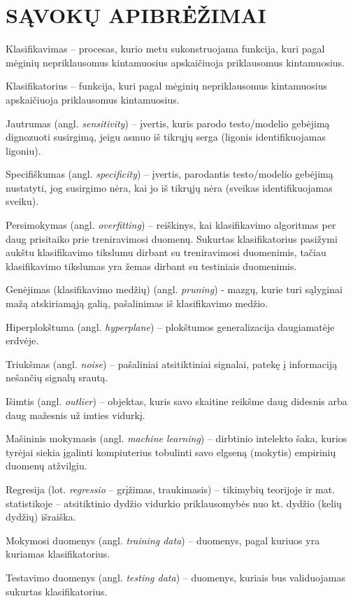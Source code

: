 \section*{SĄVOKŲ APIBRĖŽIMAI}
\label{savoku_apibrezimai}

Klasifikavimas -- procesas, kurio metu sukonstruojama funkcija, kuri pagal mėginių nepriklausomus kintamuosius apskaičiuoja priklausomus kintamuosius.

Klasifikatorius -- funkcija, kuri pagal mėginių nepriklausomus kintamuosius apskaičiuoja priklausomus kintamuosius.

Jautrumas (angl. \textit{sensitivity}) -- įvertis, kuris parodo testo/modelio gebėjimą dignozuoti susirgimą, jeigu asmuo iš tikrųjų serga (ligonis identifikuojamas ligoniu).

Specifiškumas (angl. \textit{specificity}) -- įvertis, parodantis testo/modelio gebėjimą nustatyti, jog susirgimo nėra, kai jo iš tikrųjų nėra (sveikas identifikuojamas sveiku).

Persimokymas (angl. \textit{overfitting}) -- reiškinys, kai klasifikavimo algoritmas per daug prisitaiko prie treniravimosi duomenų. Sukurtas klasifikatorius pasižymi aukštu klasifikavimo tikslumu dirbant su treniravimosi duomenimis, tačiau klasifikavimo tikslumas yra žemas dirbant su testiniais duomenimis.

Genėjimas (klasifikavimo medžių)  (angl. \textit{pruning}) - mazgų, kurie turi sąlyginai mažą atskiriamąją galią, pašalinimas iš klasifikavimo medžio.

Hiperplokštuma (angl. \textit{hyperplane}) -- plokštumos generalizacija daugiamatėje erdvėje.

Triukšmas (angl. \textit{noise}) -- pašaliniai atsitiktiniai signalai, patekę į informaciją nešančių signalų srautą.

Išimtis (angl. \textit{outlier}) -- objektas, kuris savo skaitine reikšme daug didesnis arba daug mažesnis už imties vidurkį.

Mašininis mokymasis (angl. \textit{machine learning}) -- dirbtinio intelekto šaka, kurios tyrėjai siekia įgalinti kompiuterius tobulinti savo elgseną (mokytis) empirinių duomenų atžvilgiu.

Regresija (lot. \textit{regressio} -- grįžimas, traukimasis) -- tikimybių teorijoje ir mat. statistikoje -- atsitiktinio dydžio vidurkio priklausomybės nuo kt. dydžio (kelių dydžių) išraiška.

Mokymosi duomenys (angl. \textit{training data}) -- duomenys, pagal kuriuos yra kuriamas klasifikatorius.

Testavimo duomenys (angl. \textit{testing data}) -- duomenys, kuriais bus validuojamas sukurtas klasifikatorius.
